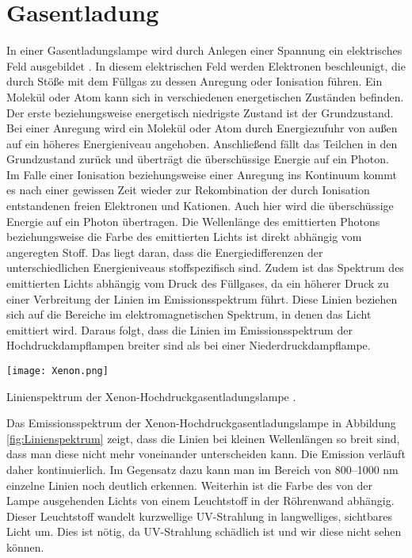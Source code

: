 \section{Gasentladung}

In einer Gasentladungslampe wird durch Anlegen einer Spannung ein elektrisches Feld ausgebildet  \cite{Gerthsen} \cite{LightandLightsources} \cite{Lichtquellen}. In diesem elektrischen Feld werden Elektronen beschleunigt, die durch Stöße mit dem Füllgas zu dessen Anregung oder Ionisation führen. Ein Molekül oder Atom kann sich in verschiedenen energetischen Zuständen befinden. Der erste beziehungsweise energetisch niedrigste Zustand ist der Grundzustand. Bei einer Anregung wird ein Molekül oder Atom durch Energiezufuhr von außen auf ein höheres Energieniveau angehoben. Anschließend fällt das Teilchen in den Grundzustand zurück und überträgt die überschüssige Energie auf ein Photon. Im Falle einer Ionisation beziehungsweise einer Anregung ins Kontinuum kommt es nach einer gewissen Zeit wieder zur Rekombination der durch Ionisation entstandenen freien Elektronen und Kationen. Auch hier wird die überschüssige Energie auf ein Photon übertragen.
Die Wellenlänge des emittierten Photons beziehungsweise die Farbe des emittierten Lichts ist direkt abhängig vom angeregten Stoff. Das liegt daran, dass die Energiedifferenzen der unterschiedlichen Energieniveaus stoffspezifisch sind. 
Zudem ist das Spektrum des emittierten Lichts abhängig vom Druck des Füllgases, da ein höherer Druck zu einer Verbreitung der Linien im Emissionsspektrum führt. Diese Linien beziehen sich auf die Bereiche im elektromagnetischen Spektrum, in denen das Licht emittiert wird. Daraus folgt, dass die Linien im Emissionsspektrum der Hochdruckdampflampen breiter sind als bei einer Niederdruckdampflampe.

\begin{dsafigure}
 \centering
 \texttt{[image: Xenon.png]}
 \caption{Linienspektrum der Xenon-Hochdruckgasentladungslampe \cite{Wikipedia}.}
 \label{fig:Linienspektrum}
\end{dsafigure}

Das Emissionsspektrum der Xenon-Hochdruckgasentladungslampe in Abbildung \ref{fig:Linienspektrum} zeigt, dass die Linien bei kleinen Wellenlängen so breit sind, dass man diese nicht mehr voneinander unterscheiden kann. Die Emission verläuft daher kontinuierlich. Im Gegensatz dazu kann man im Bereich von 800--1000 nm einzelne Linien noch deutlich erkennen.
Weiterhin ist die Farbe des von der Lampe ausgehenden Lichts von einem Leuchtstoff in der Röhrenwand abhängig. Dieser Leuchtstoff wandelt kurzwellige UV-Strahlung in langwelliges, sichtbares Licht um.
Dies ist nötig, da UV-Strahlung schädlich ist und wir diese nicht sehen können.


